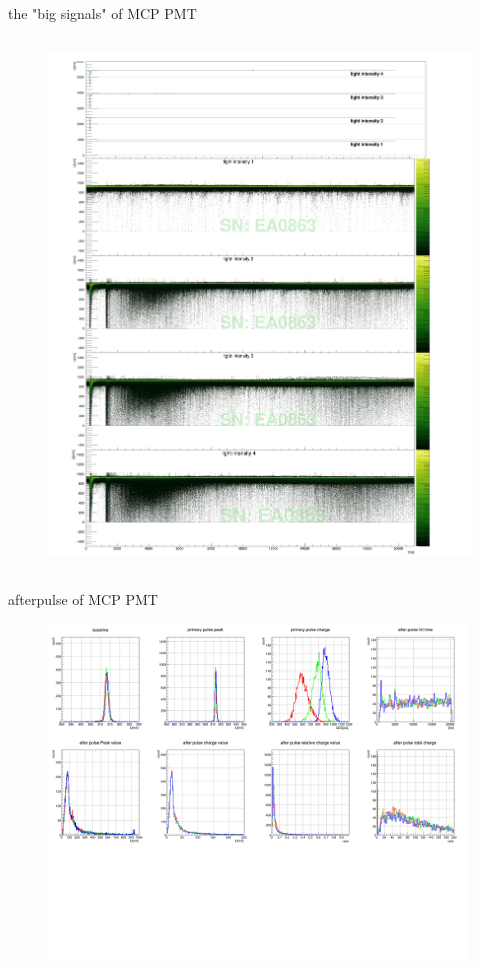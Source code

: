 \documentclass[11pt,compress,xcolor=x11names,UTF8]{beamer}
\begin{document}
\begin{frame}{the "big signals" of MCP PMT}
\begin{columns}
\begin{column}{.485\textwidth}
\begin{figure}
\includegraphics[width=1.049\textwidth]{figure/EA0863_avewave.png} %
\end{figure}
\end{column}
\end{columns}
\end{frame}
\begin{frame}{afterpulse of MCP PMT }
\begin{figure}
\centering
	\includegraphics[width=0.99\textwidth]{figure/PA1901-5048_apstats}
\end{figure}

\end{frame}
\end{document}
